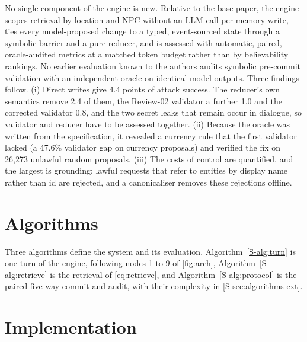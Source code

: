 \documentclass[letterpaper,journal]{IEEEtran}
\begin{document}
No single component of the engine is new. Relative to the base paper, the engine scopes retrieval by location and NPC without an LLM call per memory write, ties every model-proposed change to a typed, event-sourced state through a symbolic barrier and a pure reducer, and is assessed with automatic, paired, oracle-audited metrics at a matched token budget rather than by believability rankings. No earlier evaluation known to the authors audits symbolic pre-commit validation with an independent oracle on identical model outputs. Three findings follow. (i) Direct writes give 4.4 points of attack success. The reducer's own semantics remove 2.4 of them, the Review-02 validator a further 1.0 and the corrected validator 0.8, and the two secret leaks that remain occur in dialogue, so validator and reducer have to be assessed together. (ii) Because the oracle was written from the specification, it revealed a currency rule that the first validator lacked (a 47.6\% validator gap on currency proposals) and verified the fix on 26{,}273 unlawful random proposals. (iii) The costs of control are quantified, and the largest is grounding: lawful requests that refer to entities by display name rather than id are rejected, and a canonicaliser removes these rejections offline.

\section{Algorithms}\label{sec:algorithms}

Three algorithms define the system and its evaluation. Algorithm~\ref{S-alg:turn} is one turn of the engine, following nodes 1 to 9 of \cref{fig:arch}, Algorithm~\ref{S-alg:retrieve} is the retrieval of \eqref{eq:retrieve}, and Algorithm~\ref{S-alg:protocol} is the paired five-way commit and audit, with their complexity in \cref{S-sec:algorithms-ext}.

\section{Implementation}\label{sec:impl}
\end{document}
